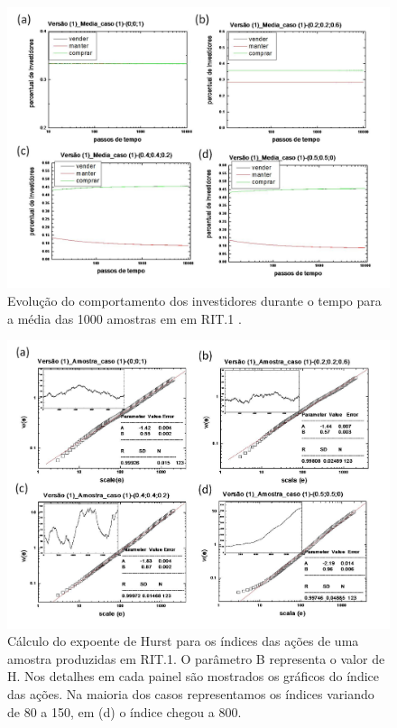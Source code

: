 \documentclass[brazil,ruledheader]{abnt}
\begin{document}
\begin{figure}[!h]
\centering
\includegraphics[width=0.8\linewidth]{Figuras/4.jpg}
\caption [Evolução média do comportamento dos investidores em RIT.1]{Evolução do
comportamento dos investidores durante o tempo para a média
das 1000 amostras em em RIT.1 .}
\label{fig:evolucao-comp-investidores2}
\end{figure}

\begin{figure}[!h]
\centering
\includegraphics[width=0.8\linewidth]{Figuras/5.jpg}
 \caption [Cálculo do expoente de Hurst para os índices das ações em RIT.1]
{Cálculo do expoente de Hurst para os índices das ações de uma amostra
produzidas em RIT.1. O parâmetro B representa o valor de H. Nos
detalhes em cada painel são mostrados os gráficos do índice das ações. Na
maioria dos casos representamos os índices variando de 80 a 150, em (d) o
índice chegou a 800.}
\label{fig:calculo-expoente-hurst}
\end{figure}
\end{document}
